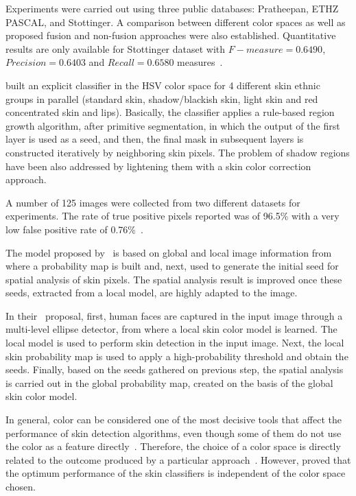 Experiments were carried out using three public databases: Pratheepan, ETHZ PASCAL, and Stottinger. A comparison between different color spaces as well as proposed fusion and non-fusion approaches were also established. Quantitative results are only available for Stottinger dataset with $F-measure = 0.6490$, $Precision = 0.6403$ and $Recall = 0.6580$ measures~\citep{tan:12}.

\citet{naji:12} built an explicit classifier in the HSV color space for 4 different skin ethnic groups in parallel (standard skin, shadow/blackish skin, light skin and red concentrated skin and lips). Basically, the classifier applies a rule-based region growth algorithm, after primitive segmentation, in which the output of the first layer is used as a seed, and then, the final mask in subsequent layers is constructed iteratively by neighboring skin pixels. The problem of shadow regions have been also addressed by lightening them with a skin color correction approach.

A number of 125 images were collected from two different datasets for experiments. The rate of true positive pixels reported was of 96.5\% with a very low false positive rate of 0.76\%~\citep{naji:12}.

The model proposed by~\citet{kawulok:13} is based on global and local image information from where a probability map is built and, next, used to generate the initial seed for spatial analysis of skin pixels. The spatial analysis result is improved once these seeds, extracted from a local model, are highly adapted to the image.

In their~\citep{kawulok:13} proposal, first, human faces are captured in the input image through a multi-level ellipse detector, from where a local skin color model is learned. The local model is used to perform skin detection in the input image. Next, the local skin probability map is used to apply a high-probability threshold and obtain the seeds. Finally, based on the seeds gathered on previous step, the spatial analysis is carried out in the global probability map, created on the basis of the global skin color model.

In general, color can be considered one of the most decisive tools that affect the performance of skin detection algorithms, even though some of them do not use the color as a feature directly~\citep{mahmoodi:16}. Therefore, the choice of a color space is directly related to the outcome produced by a particular approach~\citep{mahmoodi:16}. However, \citet{albiol:01} proved that the optimum performance of the skin classifiers is independent of the color space chosen.

